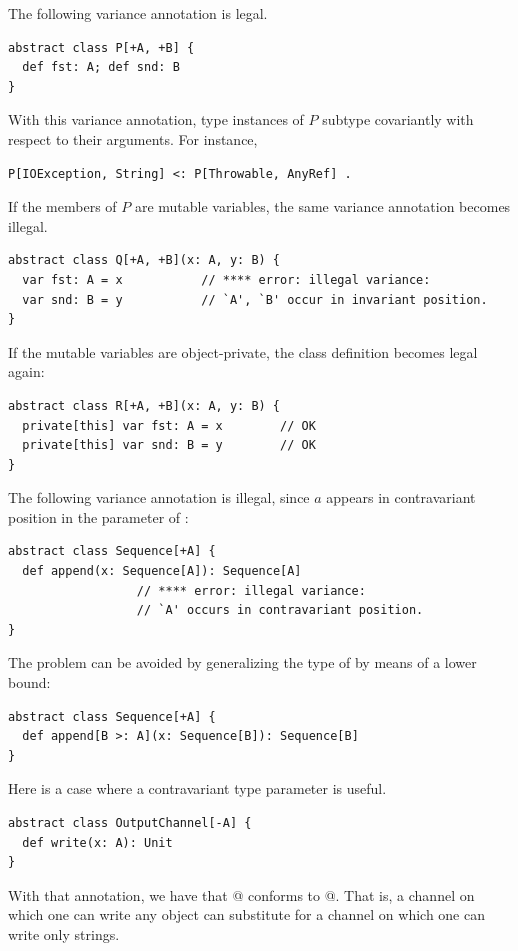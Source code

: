 \example The following variance annotation is legal. 
\begin{lstlisting}
abstract class P[+A, +B] {
  def fst: A; def snd: B
}
\end{lstlisting}
With this variance annotation, type instances
of $P$ subtype covariantly with respect to their arguments. 
For instance, 
\begin{lstlisting}
P[IOException, String] <: P[Throwable, AnyRef] .
\end{lstlisting}

If the members of $P$ are mutable variables, 
the same variance annotation becomes illegal. 
\begin{lstlisting}
abstract class Q[+A, +B](x: A, y: B) { 
  var fst: A = x           // **** error: illegal variance:
  var snd: B = y           // `A', `B' occur in invariant position.
}
\end{lstlisting}
If the mutable variables are object-private, the class definition
becomes legal again:
\begin{lstlisting}
abstract class R[+A, +B](x: A, y: B) { 
  private[this] var fst: A = x        // OK
  private[this] var snd: B = y        // OK
}
\end{lstlisting}

\example The following variance annotation is illegal, since $a$ appears
in contravariant position in the parameter of :

\begin{lstlisting}
abstract class Sequence[+A] {
  def append(x: Sequence[A]): Sequence[A]  
                  // **** error: illegal variance: 
                  // `A' occurs in contravariant position.
}
\end{lstlisting} 
The problem can be avoided by generalizing the type of 
by means of a lower bound:

\begin{lstlisting}
abstract class Sequence[+A] {
  def append[B >: A](x: Sequence[B]): Sequence[B] 
}
\end{lstlisting}

\example Here is a case where a contravariant type parameter is useful.

\begin{lstlisting}
abstract class OutputChannel[-A] {
  def write(x: A): Unit
}
\end{lstlisting}
With that annotation, we have that
\lstinline@OutputChannel[AnyRef]@ conforms to \lstinline@OutputChannel[String]@.  
That is, a
channel on which one can write any object can substitute for a channel
on which one can write only strings.

